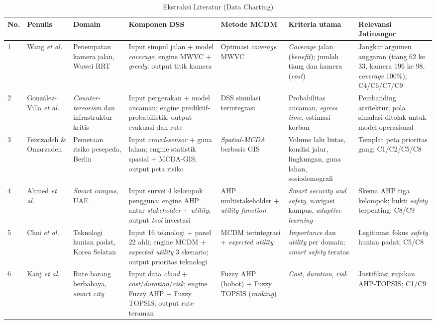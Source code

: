 \documentclass[10pt,twocolumn,a4paper]{article}
\begin{document}
\begin{table}[!t]
\centering
\caption{Ekstraksi Literatur (Data Charting)}\label{tab:charting}
\scriptsize
\begin{tabular}{@{}P{0.35cm}P{1.45cm}P{2.1cm}P{4.2cm}P{2.3cm}P{2.6cm}P{2.7cm}@{}}
\toprule
No. & Penulis & Domain & Komponen DSS & Metode MCDM & Kriteria utama & Relevansi Jatinangor \\
 & Wang \textit{et al.} \cite{wang} & Penempatan kamera jalan, Wuwei RRT & Input simpul jalan + model \textit{coverage}; engine MWVC + \textit{greedy}; output titik kamera & Optimasi \textit{coverage} MWVC & \textit{Coverage} jalan (\textit{benefit}); jumlah tiang dan kamera (\textit{cost}) & Jangkar argumen anggaran (tiang 62 ke 33, kamera 196 ke 98, \textit{coverage} 100\%); C4/C6/C7/C9 \\
2 & Gonz\'alez-Villa \textit{et al.} \cite{gonz} & \textit{Counter-terrorism} dan infrastruktur kritis & Input pergerakan + model ancaman; engine prediktif-probabilistik; output evakuasi dan rute & DSS simulasi terintegrasi & Probabilitas ancaman, \textit{egress time}, estimasi korban & Pembanding arsitektur; pola simulasi ditolak untuk model operasional \\
3 & Feizizadeh \& Omarzadeh \cite{feiz} & Pemetaan risiko pesepeda, Berlin & Input \textit{crowd-sensor} + guna lahan; engine statistik spasial + MCDA-GIS; output peta risiko & \textit{Spatial-MCDA} berbasis GIS & Volume lalu lintas, kondisi jalur, lingkungan, guna lahan, sosiodemografi & Templat peta prioritas gang; C1/C2/C5/C8 \\
4 & Ahmed \textit{et al.} \cite{ahmed} & \textit{Smart campus}, UAE & Input survei 4 kelompok pengguna; engine AHP antar-\textit{stakeholder} + \textit{utility}; output \textit{tool} investasi & AHP multistakeholder + \textit{utility function} & \textit{Smart security and safety}, navigasi kampus, \textit{adaptive learning} & Skema AHP tiga kelompok; bukti \textit{safety} terpenting; C8/C9 \\
5 & Choi \textit{et al.} \cite{choi} & Teknologi hunian padat, Korea Selatan & Input 16 teknologi + panel 22 ahli; engine MCDM + \textit{expected utility} 3 skenario; output prioritas teknologi & MCDM terintegrasi + \textit{expected utility} & \textit{Importance} dan \textit{utility} per domain; \textit{smart safety} teratas & Legitimasi fokus \textit{safety} hunian padat; C5/C8 \\
6 & Kanj \textit{et al.} \cite{kanj} & Rute barang berbahaya, \textit{smart city} & Input data \textit{cloud} + \textit{cost}/\textit{duration}/\textit{risk}; engine Fuzzy AHP + Fuzzy TOPSIS; output rute teraman & Fuzzy AHP (bobot) + Fuzzy TOPSIS (\textit{ranking}) & \textit{Cost}, \textit{duration}, \textit{risk} & Justifikasi rujukan AHP-TOPSIS; C1/C9 \\

\end{tabular}
\end{table}
\end{document}
